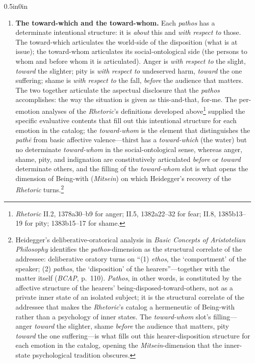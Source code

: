 \documentclass{article}
\begin{document}
\begin{adjustwidth}{0.5in}{0in}
\begin{enumerate}
        \item \textbf{The toward-which and the toward-whom.} Each \textit{pathos} has a determinate intentional structure: it is \textit{about} this and \textit{with respect to} those. The toward-which articulates the world-side of the disposition (what is at issue); the toward-whom articulates its social-ontological side (the persons to whom and before whom it is articulated). Anger is \textit{with respect to} the slight, \textit{toward} the slighter; pity is \textit{with respect to} undeserved harm, \textit{toward} the one suffering; shame is \textit{with respect to} the fall, \textit{before} the audience that matters. The two together articulate the aspectual disclosure that the \textit{pathos} accomplishes: the way the situation is given as this-and-that, for-me. The per-emotion analyses of the \textit{Rhetoric}'s definitions developed above\footnote{\textit{Rhetoric} II.2, 1378a30--b9 for anger; II.5, 1382a22--32 for fear; II.8, 1385b13--19 for pity; 1383b15--17 for shame.} supplied the specific evaluative contents that fill out this intentional structure for each emotion in the catalog; the \textit{toward-whom} is the element that distinguishes the \textit{pathē} from basic affective valence---thirst has a \textit{toward-which} (the water) but no determinate \textit{toward-whom} in the social-ontological sense, whereas anger, shame, pity, and indignation are constitutively articulated \textit{before} or \textit{toward} determinate others, and the filling of the \textit{toward-whom} slot is what opens the dimension of Being-with (\textit{Mitsein}) on which Heidegger's recovery of the \textit{Rhetoric} turns.\footnote{Heidegger's deliberative-oratorical analysis in \textit{Basic Concepts of Aristotelian Philosophy} identifies the \textit{pathos}-dimension as the structural correlate of the addressee: deliberative oratory turns on ``(1) \textit{ethos}, the `comportment' of the speaker; (2) \textit{pathos}, the `disposition' of the hearers''---together with the matter itself (\textit{BCAP}, p.~110). \textit{Pathos}, in other words, is constituted by the affective structure of the hearers' being-disposed-toward-others, not as a private inner state of an isolated subject; it is the structural correlate of the addressee that makes the \textit{Rhetoric}'s catalog a hermeneutic of Being-with rather than a psychology of inner states. The \textit{toward-whom} slot's filling---anger \textit{toward} the slighter, shame \textit{before} the audience that matters, pity \textit{toward} the one suffering---is what fills out this hearer-disposition structure for each emotion in the catalog, opening the \textit{Mitsein}-dimension that the inner-state psychological tradition obscures.}
              

\end{enumerate}
\end{adjustwidth}
\end{document}
